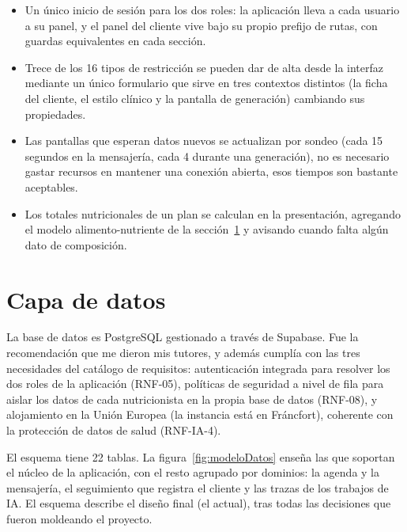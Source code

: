 \begin{itemize}
    \item Un único inicio de sesión para los dos roles: la aplicación lleva a cada usuario a su panel, y el panel del cliente vive bajo su propio prefijo de rutas, con guardas equivalentes en cada sección.
    \item Trece de los 16 tipos de restricción se pueden dar de alta desde la interfaz mediante un único formulario que sirve en tres contextos distintos (la ficha del cliente, el estilo clínico y la pantalla de generación) cambiando sus propiedades.
    \item Las pantallas que esperan datos nuevos se actualizan por sondeo (cada 15 segundos en la mensajería, cada 4 durante una generación), no es necesario gastar recursos en mantener una conexión abierta, esos tiempos son bastante aceptables.
    \item Los totales nutricionales de un plan se calculan en la presentación, agregando el modelo alimento-nutriente de la sección~\ref{sec:capaDatos} y avisando cuando falta algún dato de composición.
\end{itemize}

\section{Capa de datos}
\label{sec:capaDatos}

La base de datos es PostgreSQL gestionado a través de Supabase. Fue la recomendación que me dieron mis tutores, y además cumplía con las tres necesidades del catálogo de requisitos: autenticación integrada para resolver los dos roles de la aplicación (RNF-05), políticas de seguridad a nivel de fila para aislar los datos de cada nutricionista en la propia base de datos (RNF-08), y alojamiento en la Unión Europea (la instancia está en Fráncfort), coherente con la protección de datos de salud (RNF-IA-4).

El esquema tiene 22 tablas. La figura~\ref{fig:modeloDatos} enseña las que soportan el núcleo de la aplicación, con el resto agrupado por dominios: la agenda y la mensajería, el seguimiento que registra el cliente y las trazas de los trabajos de IA. El esquema describe el diseño final (el actual), tras todas las decisiones que fueron moldeando el proyecto.

